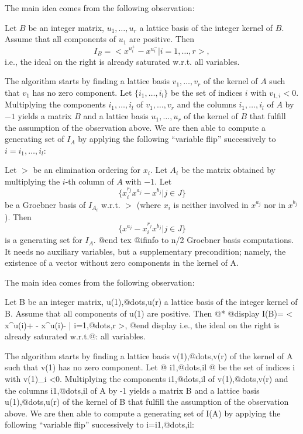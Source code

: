 The main idea comes from the following observation:

Let $B$ be an integer matrix, $u_1,\ldots,u_r$ a lattice basis of the
integer kernel of $B$. Assume that all components of $u_1$ are
positive. Then
$$ I_B=<x^{u_i^+}-x^{u_i^-}|i=1,\ldots,r>, $$
i.e., the ideal on the right is already saturated w.r.t. all variables.

The algorithm starts by finding a lattice basis $v_1,\ldots,v_r$ of the
kernel of $A$ such that $v_1$ has no zero component. Let
$\{i_1,\ldots,i_l\}$ be the set of indices $i$ with
$v_{1,i}<0$. Multiplying the components $i_1,\ldots,i_l$ of
$v_1,\ldots,v_r$ and the columns $i_1,\ldots,i_l$ of $A$ by $-1$ yields
a matrix $B$ and a lattice basis $u_1,\ldots,u_r$ of the kernel of $B$
that fulfill the assumption of the observation above. We are then able
to compute a generating set of $I_A$ by applying the following
``variable flip'' successively to $i=i_1,\ldots,i_l$:

Let $>$ be an elimination ordering for $x_i$. Let $A_i$ be the matrix
obtained by multiplying the $i$-th column of $A$ with $-1$. Let
$$\{x_i^{r_j} x^{a_j} - x^{b_j} | j\in J \}$$
be a Groebner basis of $I_{A_i}$ w.r.t. $>$ (where $x_i$ is neither
involved in $x^{a_j}$ nor in $x^{b_j}$). Then
$$\{x^{a_j} - x_i^{r_j} x^{b_j} | j\in J \}$$
is a generating set for $I_A$.
@end tex
@ifinfo
to n/2 Groebner basis
computations. It needs no auxiliary variables, but a supplementary
precondition; namely, the existence of a vector without zero components
in the kernel of A.

The main idea comes from the following observation:

Let B be an integer matrix, u(1),@dots{},u(r) a lattice basis of the
integer kernel of B. Assume that all components of u(1) are
positive. Then @*
@display
I(B)= < x^u(i)+ - x^u(i)- | i=1,@dots{},r >,
@end display
i.e., the ideal on the right is already saturated w.r.t.@: all variables.

The algorithm starts by finding a lattice basis v(1),@dots{},v(r) of the
kernel of A such that v(1) has no zero component. Let @{ i1,@dots{},il
@} be the set of indices i with v(1)_i <0. Multiplying the components
i1,@dots{},il of v(1),@dots{},v(r) and the columns i1,@dots{},il of A by
-1 yields a matrix B and a lattice basis u(1),@dots{},u(r) of the kernel
of B that fulfill the assumption of the observation above. We are then
able to compute a generating set of I(A) by applying the following
``variable flip'' successively to i=i1,@dots{},il:


